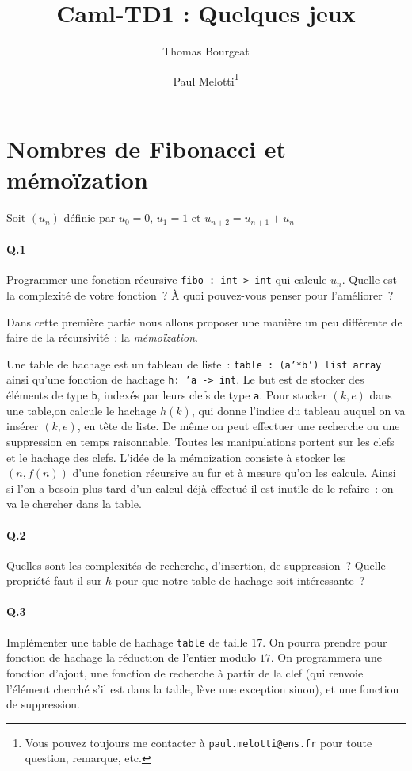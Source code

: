 \documentclass[10pt,a4paper]{article}
\begin{document}
\title{Caml-TD1 : Quelques jeux}
\author{Thomas Bourgeat \and Paul Melotti\footnote{Vous pouvez toujours me contacter à \texttt{paul.melotti@ens.fr} pour toute question, remarque, etc.}}
\maketitle{}

\section{Nombres de Fibonacci et mémoïzation}
Soit $(u_n)$ définie par $u_0=0$, $u_1=1$ et $u_{n+2}=u_{n+1}+u_n$
\paragraph{Q.1} Programmer une fonction récursive \texttt{fibo : int-> int} qui calcule $u_n$. Quelle est la complexité de votre fonction~? À quoi pouvez-vous penser pour l'améliorer~?

Dans cette première partie nous allons proposer une manière un peu différente de faire de la récursivité~: la \emph{mémoïzation}.

Une table de hachage est un tableau de liste~: \texttt{table : (a'*b')
list array} ainsi qu'une fonction de hachage \texttt{h: 'a -> int}. Le
but est de stocker des éléments de type \texttt{b}, indexés par leurs clefs de
type \texttt{a}. Pour stocker $(k,e)$ dans une table,on calcule le hachage $h(k)$,
qui donne l'indice du tableau auquel on va insérer $(k,e)$, en tête de liste. 
De même on peut effectuer une recherche ou une suppression en temps raisonnable.
Toutes les manipulations portent sur les clefs et le hachage des clefs.
L'idée de la mémoization consiste à stocker les $(n,f(n))$ d'une fonction
récursive au fur et à mesure qu'on les calcule. Ainsi si l'on a besoin plus tard
d'un calcul déjà effectué il est inutile de le refaire~: on va le
chercher dans la table.

\paragraph{Q.2}Quelles sont les complexités de recherche, d'insertion, de
suppression~? Quelle propriété faut-il sur $h$ pour que notre table de
hachage soit intéressante~?

\paragraph{Q.3} Implémenter une table de hachage \texttt{table} de taille
$17$. On pourra prendre pour fonction de hachage la réduction de l'entier 
modulo $17$. On programmera une fonction
d'ajout, une fonction de recherche à partir de la clef (qui renvoie
l'élément cherché s'il est dans la table, lève une exception sinon),
et une fonction de suppression.
\end{document}

